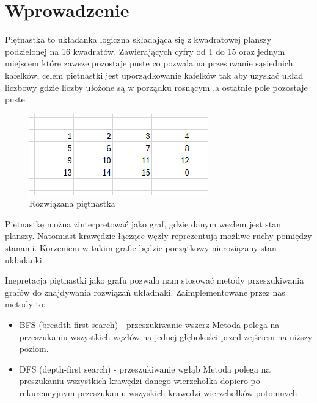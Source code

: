 \documentclass{classrep}
\begin{document}
    \section{Wprowadzenie}
    {\color{red}

    Piętnastka to układanka logiczna składająca się z kwadratowej
    planszy podzielonej na 16 kwadratów. Zawierających cyfry od 1 do 15 oraz jednym miejscem które zawsze pozostaje puste
    co pozwala na przesuwanie sąsiednich kafelków, celem piętnastki jest uporządkowanie kafelków tak aby uzyskać układ liczbowy
    gdzie liczby ułożone są w porządku rosnącym ,a ostatnie pole pozostaje puste.

    \begin{figure}
        \centering
        \includegraphics{15}
        \caption{Rozwiązana piętnastka}
    \end{figure}

    Piętnastkę można zinterpretować jako graf, gdzie danym węzłem jest stan planszy. Natomiast krawędzie łączące węzły
    reprezentują możliwe ruchy pomiędzy stanami. Korzeniem w takim grafie będzie początkowy nieroziązany stan układanki.

    Inepretacja piętnastki jako grafu pozwala nam stosować metody przeszukiwania grafów do znajdywania rozwiązań układnaki.
    Zaimplementowane przez nas metody to:
        \begin{itemize}
            \item BFS (breadth-first search) - przeszukiwanie wszerz
                Metoda polega na przeszukaniu wszystkich węzłów na jednej głębokości przed zejściem na niższy poziom.
            \item DFS (depth-first search) - przeszukiwanie wgłąb
                Metoda polega na preszukaniu wszystkich krawędzi danego wierzchołka dopiero po rekurencyjnym przeszukaniu
                wszyskich krawędzi wierzchołków potomnych


\end{itemize}}
\end{document}

